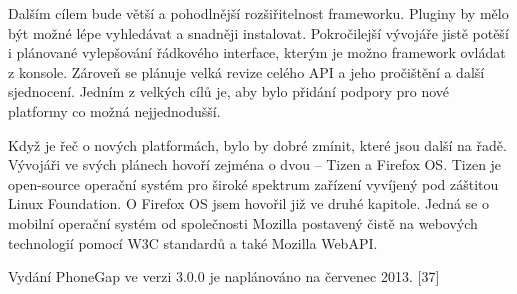 Dalším cílem bude větší a pohodlnější rozšiřitelnost frameworku. Pluginy by mělo být možné lépe vyhledávat a snadněji instalovat. Pokročilejší vývojáře jistě potěší i plánované vylepšování řádkového interface, kterým je možno framework ovládat z konsole. Zároveň se plánuje velká revize celého API a jeho pročištění a další sjednocení. Jedním z velkých cílů je, aby bylo přidání podpory pro nové platformy co možná nejjednodušší.


Když je řeč o nových platformách, bylo by dobré zmínit, které jsou další na řadě. Vývojáři ve svých plánech hovoří zejména o dvou – Tizen a Firefox OS. Tizen je open-source operační systém pro široké spektrum zařízení vyvíjený pod záštitou Linux Foundation. O Firefox OS jsem hovořil již ve druhé kapitole. Jedná se o mobilní operační systém od společnosti Mozilla postavený čistě na webových technologií pomocí W3C standardů a také Mozilla WebAPI.


Vydání PhoneGap ve verzi 3.0.0 je naplánováno na červenec 2013. [37]

